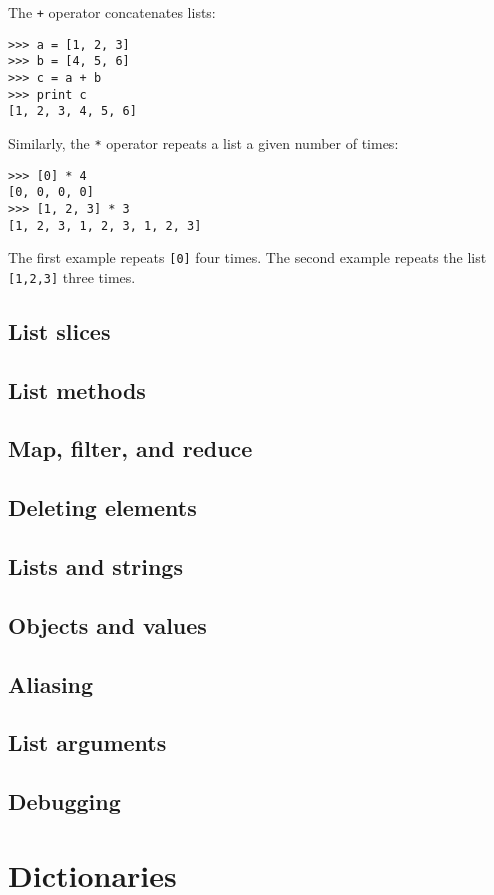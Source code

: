 \documentclass{article}
\begin{document}
The \verb|+| operator concatenates lists:
\begin{verbatim}
>>> a = [1, 2, 3]
>>> b = [4, 5, 6]
>>> c = a + b
>>> print c
[1, 2, 3, 4, 5, 6]
\end{verbatim}
\par Similarly, the \verb|*| operator repeats a list a given number of times:
\begin{verbatim}
>>> [0] * 4
[0, 0, 0, 0]
>>> [1, 2, 3] * 3
[1, 2, 3, 1, 2, 3, 1, 2, 3]
\end{verbatim}
\par The first example repeats \verb|[0]| four times. The second example
repeats the list \verb|[1,2,3]| three times.
\subsection{List slices}
\subsection{List methods}
\subsection{Map, filter, and reduce}
\subsection{Deleting elements}
\subsection{Lists and strings}
\subsection{Objects and values}
\subsection{Aliasing}
\subsection{List arguments}
\subsection{Debugging}

\section{Dictionaries}
\end{document}
